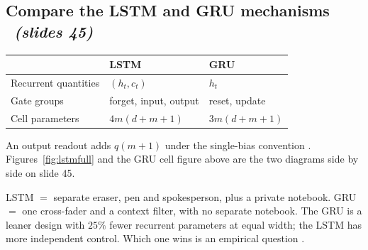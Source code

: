 \documentclass[11pt,a4paper]{article}
\newcommand{\diag}{\operatorname{diag}}
\newcommand{\thh}{\tilde h}
\newcommand{\sltag}[1]{\texorpdfstring{\ \emph{(slides #1)}}{ (slides #1)}}
\begin{document}


\subsection{Compare the LSTM and GRU mechanisms \sltag{45}}

\begin{center}
\begin{tabular}{lll}\toprule
 & LSTM & GRU\\ \midrule
Recurrent quantities & $(h_t,c_t)$ & $h_t$\\
Gate groups & forget, input, output & reset, update\\
Cell parameters & $4m(d+m+1)$ & $3m(d+m+1)$\\ \bottomrule
\end{tabular}
\end{center}
An output readout adds $q(m+1)$ under the single-bias convention \cite{r11,r7}. Figures~\ref{fig:lstmfull} and the GRU cell figure above are the two diagrams side by side on slide 45.

\begin{intuition}
LSTM $=$ separate eraser, pen and spokesperson, plus a private notebook. GRU $=$ one cross-fader and a context filter, with no separate notebook. The GRU is a leaner design with $25\%$ fewer recurrent parameters at equal width; the LSTM has more independent control. Which one wins is an empirical question \cite{r11}.
\end{intuition}

\end{document}
